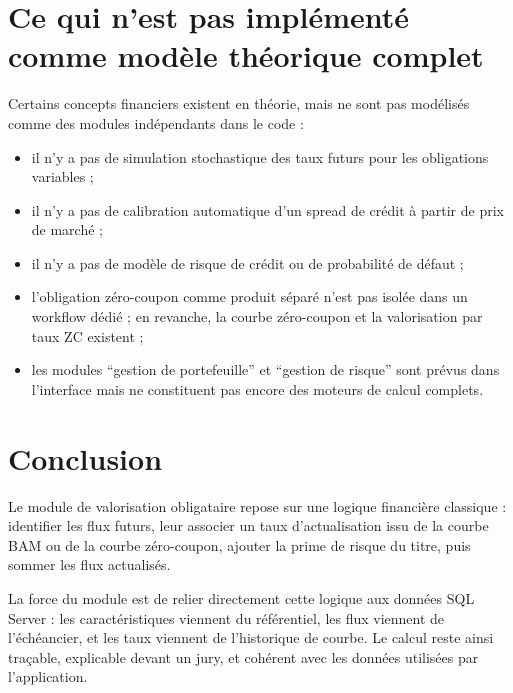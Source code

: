 \documentclass[12pt,a4paper]{article}
\begin{document}
\section{Ce qui n'est pas implémenté comme modèle théorique complet}

Certains concepts financiers existent en théorie, mais ne sont pas modélisés comme des modules indépendants dans le code :

\begin{itemize}
    \item il n'y a pas de simulation stochastique des taux futurs pour les obligations variables ;
    \item il n'y a pas de calibration automatique d'un spread de crédit à partir de prix de marché ;
    \item il n'y a pas de modèle de risque de crédit ou de probabilité de défaut ;
    \item l'obligation zéro-coupon comme produit séparé n'est pas isolée dans un workflow dédié ; en revanche, la courbe zéro-coupon et la valorisation par taux ZC existent ;
    \item les modules ``gestion de portefeuille'' et ``gestion de risque'' sont prévus dans l'interface mais ne constituent pas encore des moteurs de calcul complets.
\end{itemize}

\section*{Conclusion}

Le module de valorisation obligataire repose sur une logique financière classique : identifier les flux futurs, leur associer un taux d'actualisation issu de la courbe BAM ou de la courbe zéro-coupon, ajouter la prime de risque du titre, puis sommer les flux actualisés.

La force du module est de relier directement cette logique aux données SQL Server : les caractéristiques viennent du référentiel, les flux viennent de l'échéancier, et les taux viennent de l'historique de courbe. Le calcul reste ainsi traçable, explicable devant un jury, et cohérent avec les données utilisées par l'application.
\end{document}
